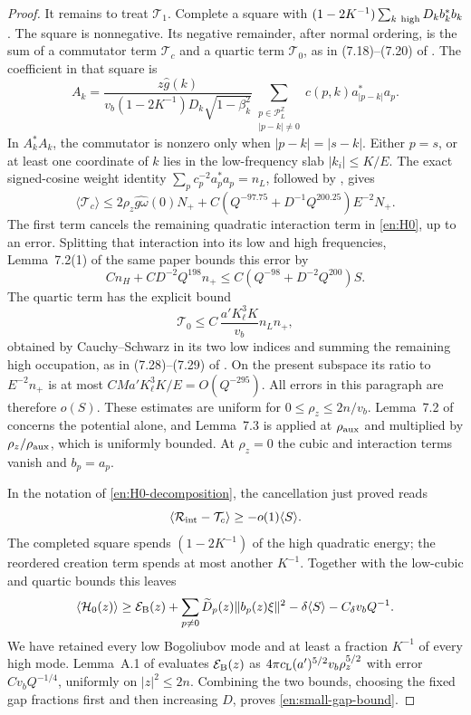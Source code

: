 \begin{proof}
It remains to treat $\mathcal T_1$.  Complete a square with
$(1-2K^{-1})\sum_{k\ {\rm high}}D_kb_k^*b_k$.
The square is nonnegative.  Its negative remainder, after normal
ordering, is the sum of a commutator term $\mathcal T_c$ and a quartic
term $\mathcal T_0$, as in (7.18)--(7.20) of \cite{FJGMOT}.
The coefficient in that square is
\[
 A_k=\frac{z\widehat g(k)}
 {v_b(1-2K^{-1})D_k\sqrt{1-\beta_k^2}}
       \sum_{\substack{p\in\mathcal P_L^{\mathbb Z}\\|p-k|\ne0}}
                  c(p,k)a_{|p-k|}^*a_p.
\]
In $A_k^*A_k$, the commutator is nonzero only when
$|p-k|=|s-k|$.  Either $p=s$, or at least one coordinate of $k$
lies in the low-frequency slab $|k_i|\le K/E$.  The exact signed-cosine
weight identity $\sum_p c_p^{-2}a_p^*a_p=n_L$, followed by
\cite[Lemmas~7.2--7.3, Equation~(7.27)]{FJGMOT}, gives
\begin{equation}\label{en:Tc-bound}
 \langle\mathcal T_c\rangle
 \le2\rho_z\widehat{g\omega}(0)N_+
       +C(Q^{-97.75}+D^{-1}Q^{200.25})E^{-2}N_+ .
\end{equation}
The first term cancels the remaining quadratic interaction term in
\eqref{en:H0}, up to an error.  Splitting that interaction into its
low and high frequencies, Lemma~7.2(1) of the same paper bounds this
error by
\[
 Cn_H+CD^{-2}Q^{198}n_+
       \le C(Q^{-98}+D^{-2}Q^{200})S.
\]
The quartic term has the explicit bound
\[
 \mathcal T_0\le C\,\frac{a'K_\ell^3K}{v_b}n_Ln_+,
\]
obtained by Cauchy--Schwarz in its two low indices and summing the
remaining high occupation, as in (7.28)--(7.29) of \cite{FJGMOT}.
On the present subspace its ratio to $E^{-2}n_+$ is at most
$CMa'K_\ell^3K/E=O(Q^{-295})$.
All errors in this paragraph are therefore $o(S)$.
These estimates are uniform for $0\le\rho_z\le2n/v_b$.
Lemma~7.2 of \cite{FJGMOT} concerns the potential alone, and
Lemma~7.3 is applied at $\rho_{\rm aux}$ and multiplied by
$\rho_z/\rho_{\rm aux}$, which is uniformly bounded.
At $\rho_z=0$ the cubic and interaction terms vanish and $b_p=a_p$.

In the notation of \eqref{en:H0-decomposition}, the cancellation
just proved reads
\[
 \langle\mathcal R_{\rm int}-\mathcal T_c\rangle
       \ge-o(1)\langle S\rangle.
\]
The completed square spends $(1-2K^{-1})$ of the high quadratic
energy; the reordered creation term spends at most another $K^{-1}$.
Together with the low-cubic and quartic bounds this leaves
\[
 \langle\mathcal H_0(z)\rangle
   \ge\mathcal E_{\rm B}(z)
       +\sum_{p\ne0}\widetilde D_p(z)\|b_p(z)\xi\|^2
       -\delta\langle S\rangle-C_\delta v_bQ^{-1}.
\]
We have retained every low Bogoliubov mode and at least a fraction
$K^{-1}$ of every high mode.  Lemma~A.1 of \cite{FJGMOT} evaluates
$\mathcal E_{\rm B}(z)$ as
$4\pi c_{\rm L}(a')^{5/2}v_b\rho_z^{5/2}$ with error
$Cv_bQ^{-1/4}$, uniformly on $|z|^2\le2n$.  Combining the two bounds,
choosing the fixed gap fractions first and then increasing $D$, proves
\eqref{en:small-gap-bound}.
\end{proof}

